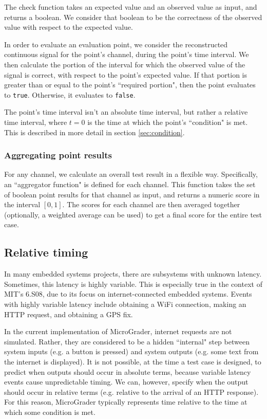 \documentclass[12pt]{article}
\begin{document}
The check function takes an expected value and an observed value as input, and returns a boolean.  We consider that boolean to be the correctness of the observed value with respect to the expected value.

In order to evaluate an evaluation point, we consider the reconstructed continuous signal for the point's channel, during the point's time interval.  We then calculate the portion of the interval for which the observed value of the signal is correct, with respect to the point's expected value.  If that portion is greater than or equal to the point's ``required portion", then the point evaluates to \texttt{true}.  Otherwise, it evaluates to \texttt{false}.

The point's time interval isn't an absolute time interval, but rather a relative time interval, where $t=0$ is the time at which the point's ``condition" is met.  This is described in more detail in section \ref{sec:condition}.

\subsubsection{Aggregating point results}
For any channel, we calculate an overall test result in a flexible way.  Specifically, an ``aggregator function" is defined for each channel.  This function takes the set of boolean point results for that channel as input, and returns a numeric score in the interval $[0,1]$.  The scores for each channel are then averaged together (optionally, a weighted average can be used) to get a final score for the entire test case.

\subsection{Relative timing}
In many embedded systems projects, there are subsystems with unknown latency.  Sometimes, this latency is highly variable.  This is especially true in the context of MIT's 6.S08, due to its focus on internet-connected embedded systems.  Events with highly variable latency include obtaining a WiFi connection, making an HTTP request, and obtaining a GPS fix.

In the current implementation of MicroGrader, internet requests are not simulated.  Rather, they are considered to be a hidden ``internal" step between system inputs (e.g. a button is pressed) and system outputs (e.g. some text from the internet is displayed).  It is not possible, at the time a test case is designed, to predict when outputs should occur in absolute terms, because variable latency events cause unpredictable timing.  We can, however, specify when the output should occur in relative terms (e.g. relative to the arrival of an HTTP response).  For this reason, MicroGrader typically represents time relative to the time at which some condition is met.
\end{document}
